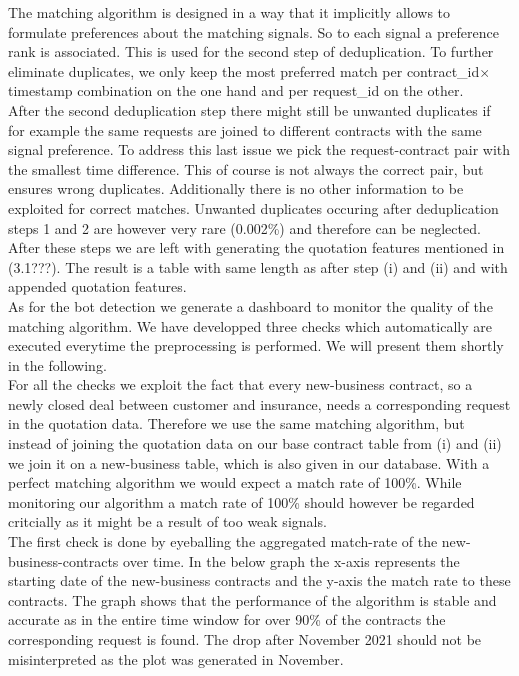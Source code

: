 \documentclass[12pt,titlepage]{article}
\begin{document}
The matching algorithm is designed in a way that it implicitly allows to formulate preferences about the matching signals. So to each signal a preference rank is associated. This is used for the second step of deduplication. To further eliminate duplicates, we only keep the most preferred match per contract\_id$\times$timestamp combination on the one hand and per request\_id on the other. \\
After the second deduplication step there might still be unwanted duplicates if for example the same requests are joined to different contracts with the same signal preference. To address this last issue we pick the request-contract pair with the smallest time difference. This of course is not always the correct pair, but ensures wrong duplicates. Additionally there is no other information to be exploited for correct matches. Unwanted duplicates occuring after deduplication steps 1 and 2 are however very rare (0.002\%) and therefore can be neglected. \\
After these steps we are left with generating the quotation features mentioned in (3.1???). The result is a table with same length as after step (i) and (ii) and with appended quotation features. \\

As for the bot detection we generate a dashboard to monitor the quality of the matching algorithm. We have developped three checks which automatically are executed everytime the preprocessing is performed. We will present them shortly in the following. \\
For all the checks we exploit the fact that every new-business contract, so a newly closed deal between customer and insurance, needs a corresponding request in the quotation data. Therefore we use the same matching algorithm, but instead of joining the quotation data on our base contract table from (i) and (ii) we join it on a new-business table, which is also given in our database. With a perfect matching algorithm we would expect a match rate of 100\%. While monitoring our algorithm a match rate of 100\% should however be regarded critcially as it might be a result of too weak signals. \\
The first check is done by eyeballing the aggregated match-rate of the new-business-contracts over time. In the below graph the x-axis represents the starting date of the new-business contracts and the y-axis the match rate to these contracts. The graph shows that the performance of the algorithm is stable and accurate as in the entire time window for over 90\% of the contracts the corresponding request is found. The drop after November 2021 should not be misinterpreted as the plot was generated in November. \\
\end{document}
